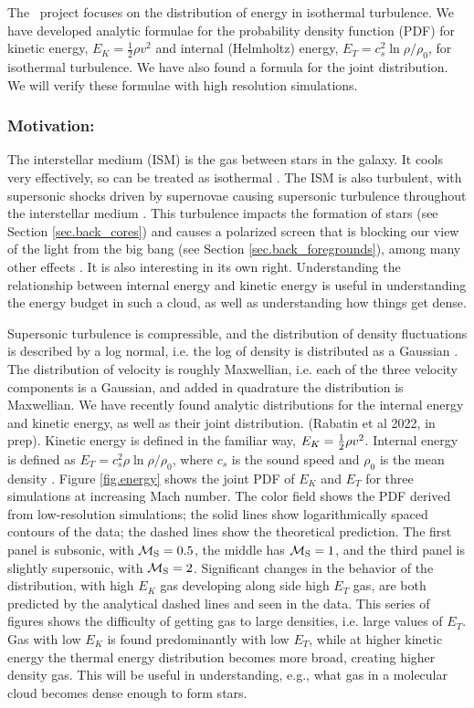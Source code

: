 The \nameTurbulence\ project focuses on the distribution of energy in isothermal
turbulence.
We have developed analytic formulae for the probability density function (PDF)
for kinetic energy, $E_K=\frac{1}{2}\rho
v^2$ and internal (Helmholtz) energy, $E_T=c_s^2 \ln \rho/\rho_0$, for
isothermal turbulence.  We have also found a formula for the joint distribution.
We will verify these formulae with high resolution simulations.

\subsubsection{Motivation: \nameTurbulence}
\label{subsec.turb_motivate}

The interstellar medium (ISM) is the gas between stars in the galaxy.  It cools
very effectively, so can be treated as isothermal \citep{Krumholz14}.  The ISM is also turbulent, with supersonic shocks driven by supernovae
causing supersonic turbulence throughout the interstellar medium
\citep{Elmegreen04}.  This
turbulence impacts the formation of stars (see Section \ref{sec.back_cores}) and
causes a polarized screen that is blocking our view of the light from the big bang (see
Section \ref{sec.back_foregrounds}), among many other effects
\citep{Elmegreen04}. It is also interesting in its own right.  Understanding the
relationship between internal energy and kinetic energy is useful in
understanding the energy budget in such a cloud, as well as understanding how
things get dense.

Supersonic turbulence is compressible, and the distribution of density
fluctuations is described by a log normal, i.e. the log of density is
distributed as a Gaussian \citep{Vazquez-Semadeni94}.  The distribution of velocity is roughly Maxwellian,
i.e. each of the three velocity components is a Gaussian, and added in quadrature the
distribution is Maxwellian.  
We have recently found analytic distributions for the internal energy and
kinetic energy, as well as their joint
distribution.   (Rabatin et al 2022, in prep). Kinetic energy is defined in the familiar way, $E_K=\frac{1}{2} \rho
v^2$.  Internal energy is defined as $E_T= c_s^2 \rho \ln \rho/\rho_0$, where
$c_s$ is the sound speed and $\rho_0$ is the mean density \citep{Banerjee18}.  
Figure \ref{fig.energy} shows 
 the joint PDF of $E_K$ and $E_T$ for three simulations at increasing Mach
 number.  The color field shows the
PDF derived from low-resolution simulations; the solid lines show logarithmically spaced contours of
the data; the dashed lines show the theoretical prediction.  The first panel is
subsonic, with $\mathcal{M_{\rm{S}}}=0.5$, the middle has $\mathcal{M_{\rm{S}}}=1$, and the third panel is
slightly supersonic, with $\mathcal{M_{\rm{S}}}=2$.  Significant changes in the behavior of the
distribution, with high $E_K$ gas developing along side high $E_T$ gas, are both
predicted by the analytical dashed lines and seen in the data.  This series of
figures shows the difficulty of getting gas to large densities, i.e. large
values of $E_T$.  Gas with low $E_K$ is found predominantly with low $E_T$,
while at higher kinetic energy the thermal energy distribution becomes more
broad, creating higher density gas.  This will be useful in understanding, e.g.,
what gas in a molecular cloud becomes dense enough to form stars.

